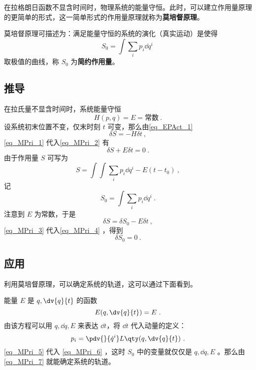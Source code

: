 在拉格朗日函数不显含时间时，物理系统的能量守恒。此时，可以建立作用量原理的更简单的形式，这一简单形式的作用量原理就称为\textbf{莫培督原理}。

莫培督原理可描述为：满足能量守恒的系统的演化（真实运动）是使得
\begin{equation}
S_0=\int\sum_i p_i\dd q^i~
\end{equation}
取极值的曲线，称 $S_0$ 为\textbf{简约作用量}。
\subsection{推导}
在拉氏量不显含时间时，系统能量守恒
\begin{equation}\label{eq_MPri_1}
H(p,q)=E=\text{常数}~.
\end{equation}
设系统初末位置不变，仅末时刻 $t$ 可变，那么由\autoref{eq_EPAct_1}~
\begin{equation}\label{eq_MPri_2}
\delta S=-H\delta t~,
\end{equation}
\autoref{eq_MPri_1} 代入\autoref{eq_MPri_2} 有
\begin{equation}\label{eq_MPri_4}
\delta S+E\delta t=0~.
\end{equation}
由于作用量 $S$ 可写为
\begin{equation}
S=\int \int\sum_i p_i\dd q^i-E(t-t_0)~,
\end{equation}
记
\begin{equation}\label{eq_MPri_6}
S_0=\int\sum_i p_i\dd q^i~.
\end{equation}
注意到 $E$ 为常数，于是
\begin{equation}\label{eq_MPri_3}
\delta S=\delta S_0-E\delta t~,
\end{equation}
\autoref{eq_MPri_3} 代入\autoref{eq_MPri_4} ，得到
\begin{equation}\label{eq_MPri_7}
\delta S_0=0~.
\end{equation}
\subsection{应用}
利用莫培督原理，可以确定系统的轨道，这可以通过下面看到。

能量 $E$ 是 $q,\dv{q}{t}$ 的函数 
\begin{equation}
E(q,\dv{q}{t})=E~.
\end{equation}
由该方程可以用 $q,\dd q,E$ 来表达 $\dd t$，将 $\dd t$ 代入动量的定义：
\begin{equation}\label{eq_MPri_5}
p_i=\pdv{}{\dot q^i}L\qty(q,\dv{q}{t})~.
\end{equation}
\autoref{eq_MPri_5} 代入 \autoref{eq_MPri_6} ，这时 $S_0$ 中的变量就仅仅是 $q,\dd q, E$ 。那么由\autoref{eq_MPri_7} 就能确定系统的轨道。